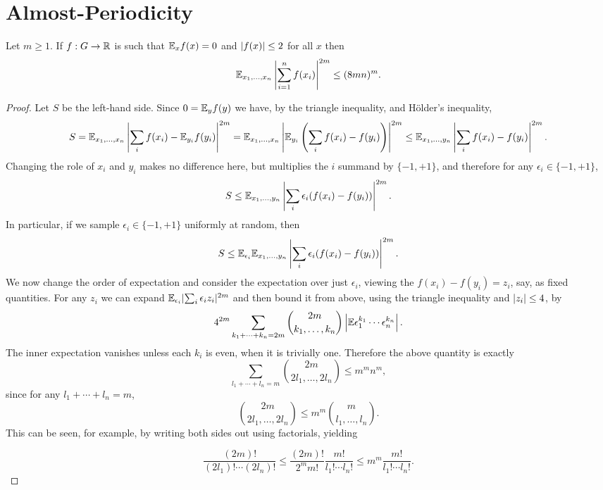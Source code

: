 \chapter{Almost-Periodicity}
\label{chap:ap}


\begin{lemma}\label{mzi}
Let $m\geq 1$. If $f:G\to\mathbb{R}$ is such that $\mathbb{E}_x f(x)=0$ and $\left\lvert f(x)\right\rvert\leq 2$ for all $x$ then
\[\mathbb{E}_{x_1,\ldots,x_n} \left\lvert \sum_{i=1}^n f(x_i)\right\rvert^{2m} \leq (8mn)^{m}.\]
\end{lemma}
\begin{proof}
Let $S$ be the left-hand side. Since $0=\mathbb{E}_y f(y)$ we have, by the triangle inequality, and H\"{o}lder's inequality,
\[S=\mathbb{E}_{x_1,\ldots,x_n}\left\lvert \sum_i f(x_i) - \mathbb{E}_{y_i} f(y_i)\right\rvert^{2m} = \mathbb{E}_{x_1,\ldots,x_n} \left\lvert\mathbb{E}_{y_i}\left( \sum_i f(x_i)-f(y_i)\right)\right\rvert^{2m}\leq \mathbb{E}_{x_1,\dots,y_n} \left\lvert \sum_i f(x_i)-f(y_i)\right\rvert^{2m}.\]
Changing the role of $x_i$ and $y_i$ makes no difference here, but multiplies the $i$ summand by $\{-1,+1\}$, and therefore for any $\epsilon_i\in\{-1,+1\}$, 
\[ S \leq\mathbb{E}_{x_1,\ldots,y_n}\left\lvert \sum_i \epsilon_i(f(x_i)-f(y_i))\right\rvert^{2m}.\]
In particular, if we sample $\epsilon_i\in\{-1,+1\}$ uniformly at random, then 
\[ S \leq\mathbb{E}_{\epsilon_i} \mathbb{E}_{x_1,\ldots,y_n}\left\lvert \sum_i \epsilon_i(f(x_i)-f(y_i))\right\rvert^{2m}.\]
We now change the order of expectation and consider the expectation over just $\epsilon_i$, viewing the $f(x_i)-f(y_i)=z_i$, say, as fixed quantities. For any $z_i$ we can expand $\mathbb{E}_{\epsilon_i} \lvert \sum_i \epsilon_iz_i\rvert^{2m}$ and then bound it from above, using the triangle inequality and $\left\lvert z_i\right\rvert\leq 4$, by 
\[4^{2m}\sum_{k_1+\cdots+k_n=2m}\binom{2m}{k_1,\ldots,k_n}\left\lvert \mathbb{E}\epsilon_1^{k_1}\cdots \epsilon_n^{k_n}\right\rvert.\]
The inner expectation vanishes unless each $k_i$ is even, when it is trivially one. Therefore the above quantity is exactly
\[\sum_{l_1+\cdots+l_n=m}\binom{2m}{2l_1,\ldots,2l_n}\leq m^mn^m,\]
since for any $l_1+\cdots+l_n=m$,
\[\binom{2m}{2l_1,\ldots,2l_n}\leq m^m\binom{m}{l_1,\ldots,l_n}.\]
This can be seen, for example, by writing both sides out using factorials, yielding

\[\frac{(2m)!}{(2l_1)!\cdots (2l_n)!}\leq \frac{(2m)!}{2^mm!}\frac{m!}{l_1!\cdots l_n!}\leq m^m\frac{m!}{l_1!\cdots l_n!}.\]
\end{proof}


